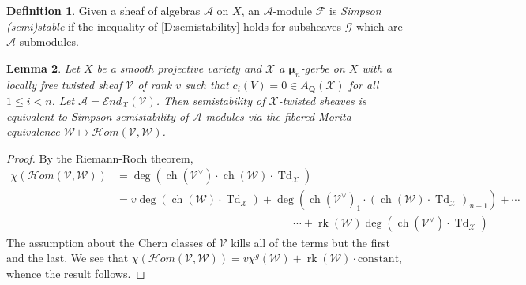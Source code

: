 \documentclass[11pt]{amsart}
\newcommand{\field}[1]{\mathbf #1}
\newcommand{\ms}[1]{\mathscr #1}
\newcommand{\Q}{\field Q}
\newcommand{\shom}{\ms H\!om}
\newcommand{\send}{\ms E\!nd}
\newcommand{\td}{\operatorname{Td}}
\DeclareMathOperator{\chern}{ch}
\newcommand{\m}{\boldsymbol{\mu}}
\renewcommand{\[}{[\!\hspace{0.03em}[}
\renewcommand{\]}{]\!\hspace{0.03em}]}
\renewcommand{\(}{(\!\hspace{0.03em}(}
\renewcommand{\)}{)\!\hspace{0.03em})}
\DeclareMathOperator{\rk}{\operatorname{rk}}
\newtheorem{lem}{Lemma}[subsubsection]%
\theoremstyle{definition}
\newtheorem{defn}[lem]{Definition}
\theoremstyle{remark}
\begin{document}
\begin{defn} Given a sheaf of algebras $\ms A$ on $X$, an $\ms A$-module $\ms 
F$ is \emph{Simpson (semi)stable\/} if the inequality of 
\ref{D:semistability} holds for subsheaves $\ms G$ which are $\ms 
A$-submodules.
\end{defn}

\begin{lem}\label{L:semistab same as simpson} Let $X$ be a smooth projective 
variety and $\ms X$ a 
$\m_{n}$-gerbe on $X$ with a locally free twisted sheaf $\ms V$ of 
rank $v$ such 
that $c_{i}(V)=0\in A_{\Q}(\ms X)$ for all $1\leq i<n$.  
Let $\ms A=\send_{\ms X}(\ms V)$.  Then semistability of $\ms 
X$-twisted sheaves is equivalent to Simpson-semistability of $\ms 
A$-modules via the fibered Morita equivalence $\ms W\mapsto\shom(\ms V,\ms W)$.
\end{lem}
\begin{proof} By the Riemann-Roch theorem,
\begin{equation*}\begin{split}
    \chi(\shom(\ms V,\ms W))&=\deg(\chern(\ms V^{\vee})\cdot\chern(\ms 
    W)\cdot\td_{\ms X})\\
    &=v\deg(\chern(\ms W)\cdot\td_{\ms X})+\deg(\chern(\ms 
V^{\vee})_{1}\cdot(\chern(\ms W)\cdot\td_{\ms 
X})_{n-1})+\cdots\\
&\qquad\qquad\qquad\qquad\qquad\qquad\qquad\qquad\cdots+\rk(\ms W)\deg(\chern(\ms V^{\vee})\cdot\td_{\ms 
X})
\end{split}\end{equation*}
The assumption about the Chern classes of $\ms V$ kills all 
of the terms but the first and the last.  We see that $\chi(\shom(\ms 
V,\ms W))=v\chi^{g}(\ms W)+\rk(\ms W)\cdot\text{constant},$ whence the result 
follows.
\end{proof}
\end{document}
